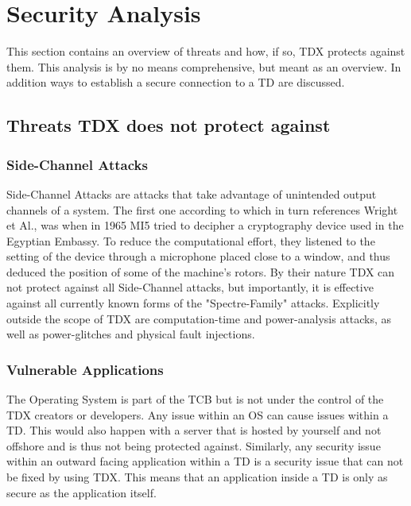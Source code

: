 
\chapter{Security Analysis}
\label{Security Analysis}

This section contains an overview of threats and how, if so, TDX protects against them. This analysis is by no means comprehensive, but meant as an overview. In addition ways to establish a secure connection to a TD are discussed.

\section{Threats TDX does not protect against}

\subsection{Side-Channel Attacks}

Side-Channel Attacks are attacks that take advantage of unintended output channels of a system. The first one according to \cite{zhou_side-channel_nodate} which in turn references Wright et Al., was when in 1965 MI5 tried to decipher a cryptography device used in the Egyptian Embassy. To reduce the computational effort, they listened to the setting of the device through a microphone placed close to a window, and thus deduced the position of some of the machine's rotors.
By their nature TDX can not protect against all Side-Channel attacks, but importantly, it is effective against all currently known forms of the "Spectre-Family" attacks. Explicitly outside the scope of TDX are computation-time and power-analysis attacks, as well as power-glitches and physical fault injections.

\subsection{Vulnerable Applications}

The Operating System is part of the \Gls{TCB} but is not under the control of the TDX creators or developers. Any issue within an \Gls{OS} can cause issues within a \Gls{TD}. This would also happen with a server that is hosted by yourself and not offshore and is thus not being protected against. Similarly, any security issue within an outward facing application within a \Gls{TD} is a security issue that can not be fixed by using TDX. This means that an application inside a TD is only as secure as the application itself. 

